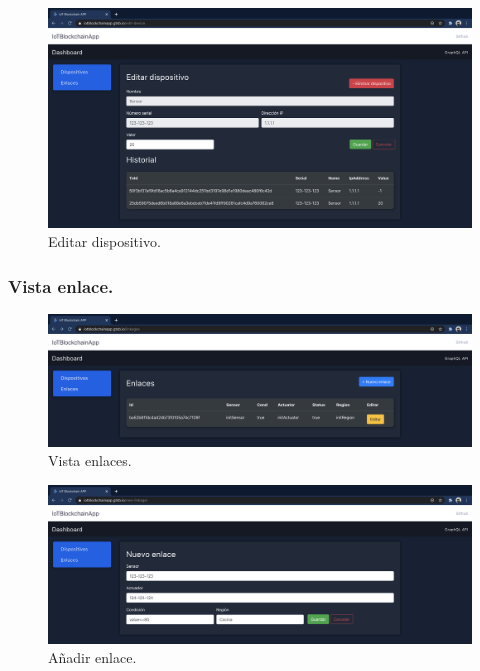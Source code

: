 \begin{figure}[h!]
  \centering
  \includegraphics[width=\textwidth]{imagenes/desarrollo/web/editar_dispositivo}
  \caption{Editar dispositivo.}
  \label{fig:editar-dispositivo}
\end{figure}

\newpage

\subsubsection*{Vista enlace.}

\begin{figure}[h!]
  \centering
  \includegraphics[width=\textwidth]{imagenes/desarrollo/web/vista_enlaces}
  \caption{Vista enlaces.}
  \label{fig:vista-enlace}
\end{figure}

\begin{figure}[h!]
  \centering
  \includegraphics[width=\textwidth]{imagenes/desarrollo/web/aniadir_enlace}
  \caption{Añadir enlace.}
  \label{fig:aniadir-enlace}
\end{figure}

